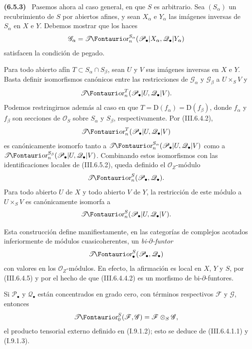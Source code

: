 \documentclass[10pt,oneside]{book}
\makeatletter
\newcommand{\sh}[1]{\mathscr{#1}}
\newcommand*{\ega@sheafop}[3]{\sh{#1}#2\textup{\kern-2.2pt{\Fontauri\slshape #3}}}
\newcommand{\shTor}{\ega@sheafop{T}{}{or}}
\newcommand{\sref}[2][]{\textup{(#2)}}
\newenvironment{env}[1][]{\par\medskip\noindent\textbf{(#1)}\ }{\par}
\makeatother
\begin{document}
\begin{env}[6.5.3]
\label{III.6.5.3}
Pasemos ahora al caso general, en que $S$ es arbitrario. Sea
$(S_\alpha)$ un recubrimiento de $S$ por abiertos afines, y sean
$X_\alpha$ e $Y_\alpha$ las imágenes inversas de $S_\alpha$ en
$X$ e $Y$. Debemos mostrar que los haces
\[
  \sh G_\alpha
  =
  \boldsymbol{\shTor}_n^{S_\alpha}
  (\sh P_\bullet|X_\alpha,\sh Q_\bullet|Y_\alpha)
\]
satisfacen la condición de pegado.

Para todo abierto afín $T\subset S_\alpha\cap S_\beta$, sean
$U$ y $V$ sus imágenes inversas en $X$ e $Y$. Basta definir
isomorfismos canónicos entre las restricciones de $\sh G_\alpha$
y $\sh G_\beta$ a $U\times_SV$ y
\[
  \boldsymbol{\shTor}_n^T(\sh P_\bullet|U,\sh Q_\bullet|V).
\]
Podemos restringirnos además al caso en que
$T=\mathrm D(f_\alpha)=\mathrm D(f_\beta)$, donde $f_\alpha$ y
$f_\beta$ son secciones de $\sh O_S$ sobre $S_\alpha$ y
$S_\beta$, respectivamente. Por \sref{III.6.4.2},
\[
  \boldsymbol{\shTor}_n^T(\sh P_\bullet|U,\sh Q_\bullet|V)
\]
es canónicamente isomorfo tanto a
$\boldsymbol{\shTor}_n^{S_\alpha}(\sh P_\bullet|U,\sh Q_\bullet|V)$ como a
$\boldsymbol{\shTor}_n^{S_\beta}(\sh P_\bullet|U,\sh Q_\bullet|V)$.
Combinando estos isomorfismos con las identificaciones locales de
\sref{III.6.5.2}, queda definido el $\sh O_Z$-módulo
\[
  \boldsymbol{\shTor}_n^S(\sh P_\bullet,\sh Q_\bullet).
\]
Para todo abierto $U$ de $X$ y todo abierto $V$ de $Y$, la
restricción de este módulo a $U\times_SV$ es canónicamente
isomorfa a
\[
  \boldsymbol{\shTor}_n^S(\sh P_\bullet|U,\sh Q_\bullet|V).
\]

Esta construcción define manifiestamente, en las categorías de
complejos acotados inferiormente de módulos cuasicoherentes, un
\emph{bi-$\partial$-funtor}
\[
  \boldsymbol{\shTor}_\bullet^S(\sh P_\bullet,\sh Q_\bullet)
\]
con valores en los $\sh O_Z$-módulos. En efecto, la afirmación es
local en $X$, $Y$ y $S$, por \sref{III.6.4.5} y por el hecho de
que \sref{III.6.4.4.2} es un morfismo de bi-$\partial$-funtores.

Si $\sh P_\bullet$ y $\sh Q_\bullet$ están concentrados en grado
cero, con términos respectivos $\sh F$ y $\sh G$, entonces
\[
  \shTor_0^S(\sh F,\sh G)
  =
  \sh F\otimes_S\sh G,
\]
el producto tensorial externo definido en \sref[I]{I.9.1.2}; esto
se deduce de \sref{III.6.4.1.1} y \sref[I]{I.9.1.3}.
\end{env}
\end{document}
